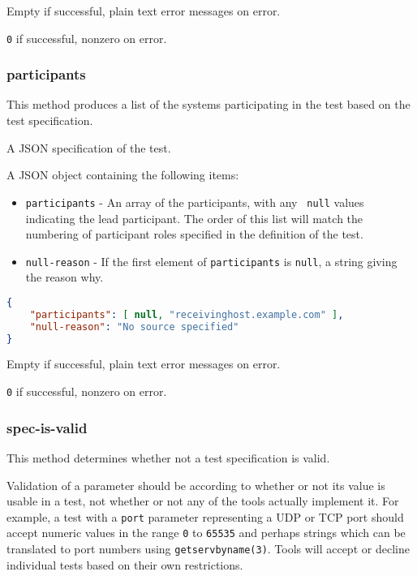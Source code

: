 \documentclass[10pt,titlepage]{article}
\begin{document}
 Empty if successful, plain text error
messages on error.

 {\tt 0} if successful, nonzero on error.



\subsubsection{participants}
This method produces a list of the systems participating in the test
based on the test specification.

 A JSON specification of the test.

 A JSON object containing the following
items:

\begin{itemize}
\item{\tt participants} - An array of the participants, with any {\tt
  null} values indicating the lead participant.  The order of this
  list will match the numbering of participant roles specified in the
  definition of the test.
\item{\tt null-reason} - If the first element of {\tt participants} is
  {\tt null}, a string giving the reason why.
\end{itemize}

\example
\begin{lstlisting}[language=json,firstnumber=1]
{
    "participants": [ null, "receivinghost.example.com" ],
    "null-reason": "No source specified"
}
\end{lstlisting}

 Empty if successful, plain text error
messages on error.

 {\tt 0} if successful, nonzero on error.



\subsubsection{spec-is-valid}
This method determines whether not a test specification is valid.

Validation of a parameter should be according to whether or not its
value is usable in a test, not whether or not any of the tools
actually implement it.  For example, a test with a {\tt port}
parameter representing a UDP or TCP port should accept numeric values
in the range {\tt 0} to {\tt 65535} and perhaps strings which can be
translated to port numbers using {\tt getservbyname(3)}.  Tools will
accept or decline individual tests based on their own restrictions.
\end{document}
